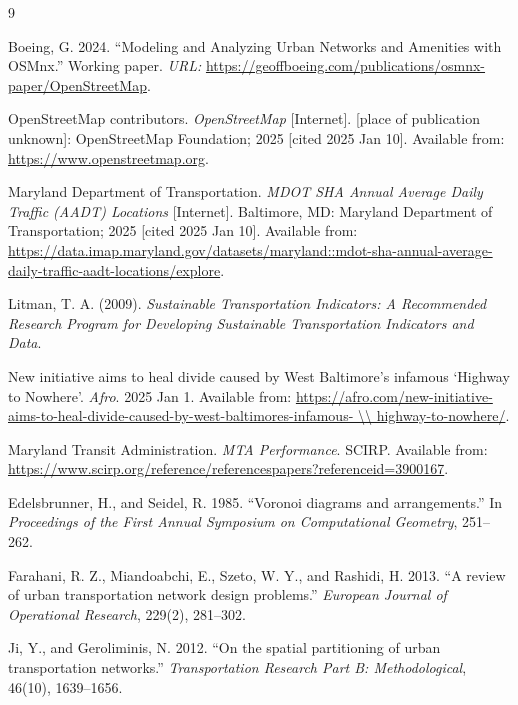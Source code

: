 \documentclass{mcmthesis}
\begin{document}
\newpage
\begin{thebibliography}{9}

Boeing, G. 2024. ``Modeling and Analyzing Urban Networks and Amenities with OSMnx.'' Working paper. \textit{URL:} \url{https://geoffboeing.com/publications/osmnx-paper/OpenStreetMap}.

OpenStreetMap contributors. \textit{OpenStreetMap} [Internet]. [place of publication unknown]: OpenStreetMap Foundation; 2025 [cited 2025 Jan 10]. Available from: \url{https://www.openstreetmap.org}.

Maryland Department of Transportation. \textit{MDOT SHA Annual Average Daily Traffic (AADT) Locations} [Internet]. Baltimore, MD: Maryland Department of Transportation; 2025 [cited 2025 Jan 10]. Available from: \url{https://data.imap.maryland.gov/datasets/maryland::mdot-sha-annual-average-daily-traffic-aadt-locations/explore}.

Litman, T. A. (2009). \textit{Sustainable Transportation Indicators: A Recommended Research Program for Developing Sustainable Transportation Indicators and Data}.

New initiative aims to heal divide caused by West Baltimore’s infamous ‘Highway to Nowhere’. \textit{Afro}. 2025 Jan 1. Available from: \url{https://afro.com/new-initiative-aims-to-heal-divide-caused-by-west-baltimores-infamous- \\ highway-to-nowhere/}.

Maryland Transit Administration. \textit{MTA Performance}. SCIRP. Available from: \url{https://www.scirp.org/reference/referencespapers?referenceid=3900167}.

Edelsbrunner, H., and Seidel, R. 1985. ``Voronoi diagrams and arrangements.'' In \textit{Proceedings of the First Annual Symposium on Computational Geometry}, 251--262.

Farahani, R. Z., Miandoabchi, E., Szeto, W. Y., and Rashidi, H. 2013. ``A review of urban transportation network design problems.'' \textit{European Journal of Operational Research}, 229(2), 281--302.

Ji, Y., and Geroliminis, N. 2012. ``On the spatial partitioning of urban transportation networks.'' \textit{Transportation Research Part B: Methodological}, 46(10), 1639--1656.

\end{thebibliography}
\end{document}
